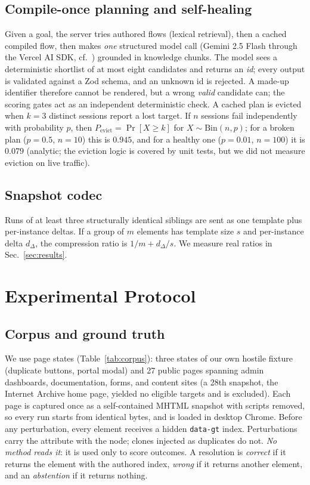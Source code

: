 \documentclass[conference]{IEEEtran}
\begin{document}
\subsection{Compile-once planning and self-healing}
Given a goal, the server tries authored flows (lexical retrieval), then a cached compiled flow, then makes \emph{one} structured model call (Gemini 2.5 Flash through the Vercel AI SDK, cf.~\cite{comanici2025}) grounded in knowledge chunks. The model sees a deterministic shortlist of at most eight candidates and returns an \emph{id}; every output is validated against a Zod schema, and an unknown id is rejected. A made-up identifier therefore cannot be rendered, but a wrong \emph{valid} candidate can; the scoring gates act as an independent deterministic check. A cached plan is evicted when $k{=}3$ distinct sessions report a lost target. If $n$ sessions fail independently with probability $p$, then $P_{\text{evict}}=\Pr[X\ge k]$ for $X\sim\mathrm{Bin}(n,p)$; for a broken plan ($p{=}0.5$, $n{=}10$) this is $0.945$, and for a healthy one ($p{=}0.01$, $n{=}100$) it is $0.079$ (analytic; the eviction logic is covered by unit tests, but we did not measure eviction on live traffic).

\subsection{Snapshot codec}
Runs of at least three structurally identical siblings are sent as one template plus per-instance deltas. If a group of $m$ elements has template size $s$ and per-instance delta $d_\Delta$, the compression ratio is $1/m+d_\Delta/s$. We measure real ratios in Sec.~\ref{sec:results}.

\section{Experimental Protocol}\label{sec:protocol}
\subsection{Corpus and ground truth}
We use \nPages{} page states (Table~\ref{tab:corpus}): three states of our own hostile fixture (duplicate buttons, portal modal) and 27 public pages spanning admin dashboards, documentation, forms, and content sites (a 28th snapshot, the Internet Archive home page, yielded no eligible targets and is excluded). Each page is captured once as a self-contained MHTML snapshot with scripts removed, so every run starts from identical bytes, and is loaded in desktop Chrome. Before any perturbation, every element receives a hidden \texttt{data-gt} index. Perturbations carry the attribute with the node; clones injected as duplicates do not. \emph{No method reads it}: it is used only to score outcomes. A resolution is \emph{correct} if it returns the element with the authored index, \emph{wrong} if it returns another element, and an \emph{abstention} if it returns nothing.
\end{document}
